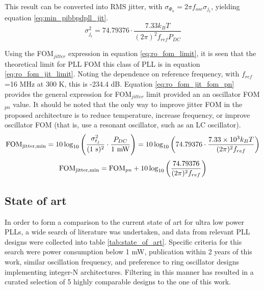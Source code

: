 	 This result can be converted into RMS jitter, with $\sigma_{\Phi_{n}} = 2\pi f_{osc}\sigma_{j_t}$, yielding equation \ref{eq:min_pibbpdpll_jit}.
	\begin{equation}\label{eq:min_pibbpdpll_jit}
		\sigma_{j_t}^2 = 74.79376\cdot  \frac{7.33 k_B T}{(2\pi)^2f_{ref}P_{DC}}
	\end{equation}


	  Using the FOM$_{jitter}$ expression in equation \ref{eq:ro_fom_limit}, it is seen that the theoretical limit for PLL FOM this class of PLL is in equation \ref{eq:ro_fom_jit_limit}. Noting the dependence on reference frequency, with $f_{ref}$=16 MHz at 300 K, this is -234.4 dB. Equation \ref{eq:ro_fom_jit_fom_pn} provides the general expression for FOM$_{jitter}$ limit provided an an oscillator FOM$_{pn}$ value. It should be noted that the only way to improve jitter FOM in the proposed architecture is to reduce temperature, increase frequency, or improve oscillator FOM (that is, use a resonant oscillator, such as an LC oscillator).
	\begin{equation}\label{eq:ro_fom_jit_limit}
		\textnormal{FOM}_{\textnormal{jitter,min}} = 10\log_{10}\left(\frac{\sigma_{t_j}^2}{(\textnormal{1 s})^2}\cdot\frac{P_{DC}}{\textnormal{1 mW}}\right) =  10\log_{10}\left( 74.79376\cdot  \frac{7.33\times 10^3 k_B T}{(2\pi)^2f_{ref}} \right)
	\end{equation}
	\begin{equation}\label{eq:ro_fom_jit_fom_pn}
		\textnormal{FOM}_{\textnormal{jitter,min}} = \textnormal{FOM}_{pn} + 10\log_{10}\left(\frac{74.79376}{(2\pi)^2 f_{ref}} \right)
	\end{equation}

\subsection{State of art}
In order to form a comparison to the current state of art for ultra low power PLLs, a wide search of  literature was undertaken, and data from relevant PLL designs were collected into table \ref{tab:state_of_art}. Specific criteria for this search were power consumption below 1 mW, publication within 2 years of this work, similar oscillation frequency, and preference to ring oscillator designs implementing integer-N architectures. Filtering in this manner has resulted in a curated selection of 5 highly comparable designs to the one of this work.

